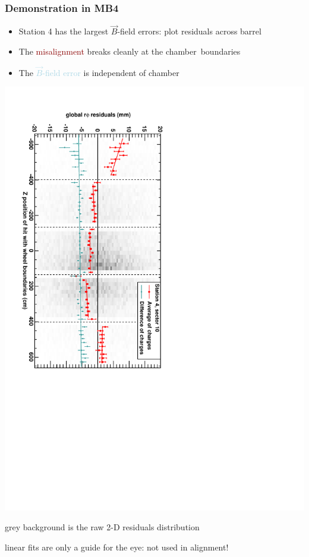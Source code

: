 \documentclass[compress]{beamer}
\begin{document}
\begin{frame}
\frametitle{Demonstration in MB4}

\begin{itemize}
\item Station 4 has the largest $\vec{B}$-field errors: plot residuals across barrel
\item The \textcolor{darkred}{misalignment} breaks cleanly at the \mbox{chamber boundaries\hspace{-1 cm}}
\item The \textcolor{lightblue}{$\vec{B}$-field error} is independent of chamber
\end{itemize}

\includegraphics[height=\linewidth, angle=90]{demo_of_bfield.pdf}

\scriptsize grey background is the raw 2-D residuals distribution

linear fits are only a guide for the eye: not used in alignment!
\end{frame}
\end{document}

